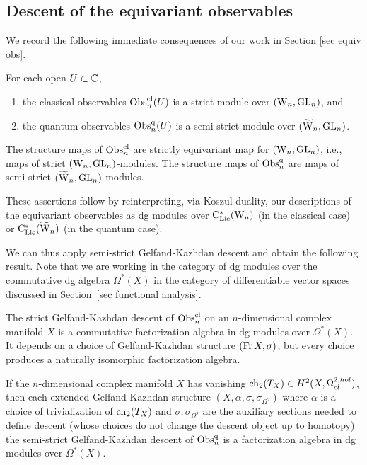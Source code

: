 \subsection{Descent of the equivariant observables}

We record the following immediate consequences of our work in Section
\ref{sec equiv obs}.

\begin{prop}
For each open $U \subset \mathbb C$,
\begin{enumerate}
\item the classical observables ${\rm Obs}^{\rm cl}_n(U)$ is a strict module over $({{\rm W}_n},{\rm GL}_n)$, and
\item the quantum observables ${\rm Obs}^{\rm q}_n(U)$ is a semi-strict module over $(\widetilde{{{\rm W}}}_n,{\rm GL}_n)$.
\end{enumerate}
The structure maps of ${\rm Obs}^{\rm cl}_n$ are strictly equivariant map for $({{\rm W}_n},{\rm GL}_n)$, 
i.e., maps of strict $({{\rm W}_n},{\rm GL}_n)$-modules.
The structure maps of ${\rm Obs}^{\rm q}_n$ are maps of semi-strict $(\widetilde{{{\rm W}}}_n,{\rm GL}_n)$-modules.
\end{prop}

These assertions follow by reinterpreting, via Koszul duality, 
our descriptions of the equivariant observables as dg modules 
over ${\rm C}_{\rm Lie}^*({{\rm W}_n})$ (in the classical case) or ${\rm C}_{\rm Lie}^*(\widetilde{{{\rm W}}}_n)$ (in the quantum case).

We can thus apply semi-strict Gelfand-Kazhdan descent and obtain the following result.
Note that we are working in the category of dg modules over the commutative dg algebra $\Omega^*(X)$ 
in the category of differentiable vector spaces discussed in Section~\ref{sec functional analysis}.


\begin{cor}
The strict Gelfand-Kazhdan descent of ${\rm Obs}^{\rm cl}_n$ on an $n$-dimensional complex manifold $X$ 
is a commutative factorization algebra in dg modules over $\Omega^*(X)$.
It depends on a choice of Gelfand-Kazhdan structure $({\rm Fr}\, X, \sigma)$,
but every choice produces a naturally isomorphic factorization algebra.

If the $n$-dimensional complex manifold $X$ has vanishing ${\rm ch}_2(T_X)
\in H^2(X, \Omega^{2,hol}_{cl})$, then each extended Gelfand-Kazhdan structure $(X, \alpha, \sigma,
\sigma_{\Omega^2})$ where $\alpha$ is a choice of trivialization of
${\rm ch}_2(T_X)$ and $\sigma,\sigma_{\Omega^2}$ are the auxiliary sections
needed to define descent (whose choices do not change the descent object up to homotopy)
the semi-strict Gelfand-Kazhdan descent of ${\rm Obs}^{\rm q}_n$ is a factorization algebra in dg modules over $\Omega^*(X)$.
\end{cor}

